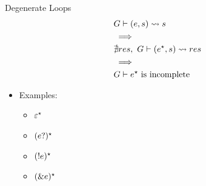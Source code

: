 \documentclass{beamer}
\begin{document}
\begin{frame}{Degenerate Loops}
    \begin{align*}
        & G \vdash (e, s) \rightsquigarrow s \\
        & \implies \\
        & \nexists res,\ G \vdash (e^\star, s) \rightsquigarrow res \\
        & \implies \\
        & \text{$G \vdash e^\star$ is incomplete}
    \end{align*}
    \begin{itemize}
        \item Examples:
        \begin{itemize}
            \item $\varepsilon^\star$
            \item $(e?)^\star$
            \item $(!e)^\star$
            \item $(\&e)^\star$
        \end{itemize}
    \end{itemize}
\end{frame}
\end{document}
